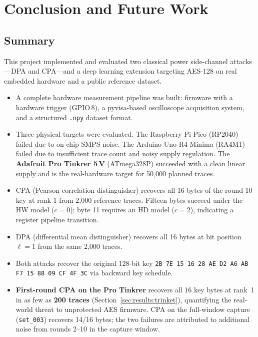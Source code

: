 \section{Conclusion and Future Work}
\label{sec:conclusion}

\subsection{Summary}

This project implemented and evaluated two classical power side-channel
attacks---DPA and CPA---and a deep learning extension targeting AES-128
on real embedded hardware and a public reference dataset.

\begin{itemize}
  \item A complete hardware measurement pipeline was built: firmware with a
        hardware trigger (GPIO\,8), a pyvisa-based oscilloscope acquisition
        system, and a structured \texttt{.npy} dataset format.

  \item Three physical targets were evaluated.
        The Raspberry Pi Pico (RP2040) failed due to on-chip SMPS noise.
        The Arduino Uno R4 Minima (RA4M1) failed due to insufficient trace
        count and noisy supply regulation.
        The \textbf{Adafruit Pro Tinkrer 5\,V} (ATmega328P) succeeded with
        a clean linear supply and is the real-hardware target for 50{,}000
        planned traces.

  \item CPA (Pearson correlation distinguisher) recovers all 16 bytes of
        the round-10 key at rank 1 from 2{,}000 reference traces.
        Fifteen bytes succeed under the HW model ($c=0$); byte 11 requires
        an HD model ($c=2$), indicating a register pipeline transition.

  \item DPA (differential mean distinguisher) recovers all 16 bytes
        at bit position $\ell=1$ from the same 2{,}000 traces.

  \item Both attacks recover the original 128-bit key
        \texttt{2B 7E 15 16 28 AE D2 A6 AB F7 15 88 09 CF 4F 3C}
        via backward key schedule.

  \item \textbf{First-round CPA on the Pro Tinkrer } recovers all 16 key bytes
        at rank~1 in as few as \textbf{200 traces} (Section~\ref{sec:results:trinket}),
        quantifying the real-world threat to unprotected AES firmware.
        CPA on the full-window capture (\texttt{set\_003}) recovers 14/16
        bytes; the two failures are attributed to additional noise from rounds
        2--10 in the capture window.


\end{itemize}
